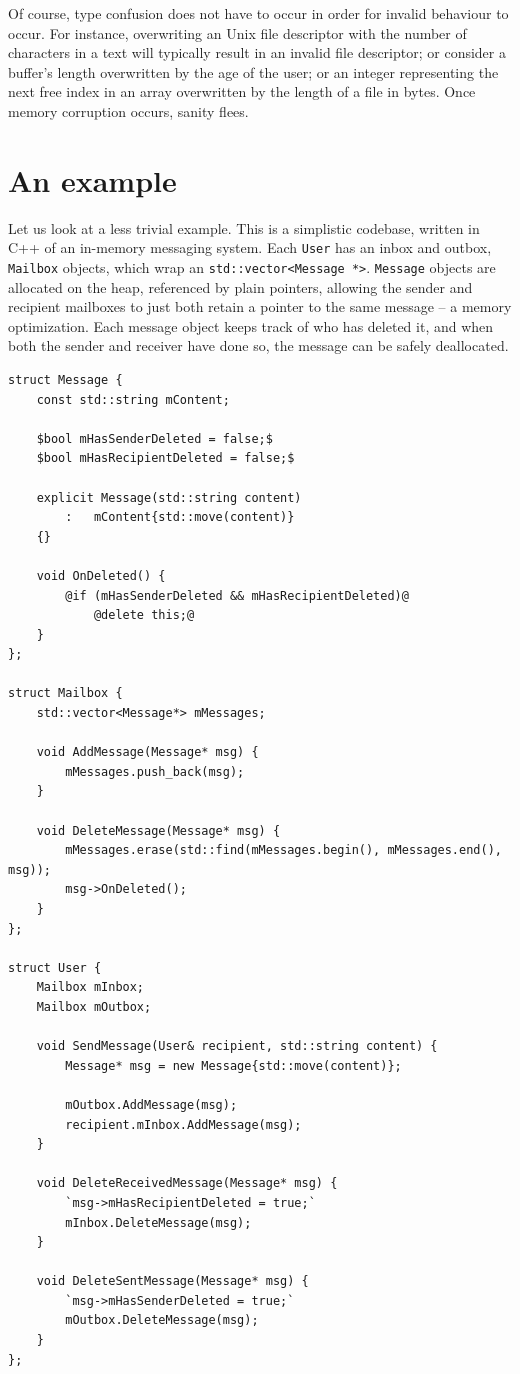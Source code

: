 Of course, type confusion does not have to occur in order for invalid behaviour to occur. For instance, overwriting an Unix file descriptor with the number of characters in a text will typically result in an invalid file descriptor; or consider a buffer's length overwritten by the age of the user; or an integer representing the next free index in an array overwritten by the length of a file in bytes. Once memory corruption occurs, sanity flees.

\section{An example}

Let us look at a less trivial example. This is a simplistic codebase, written in C++ of an in-memory messaging system. Each \lstinline!User! has an inbox and outbox, \lstinline!Mailbox! objects, which wrap an \lstinline!std::vector<Message *>!. \lstinline!Message! objects are allocated on the heap, referenced by plain pointers, allowing the sender and recipient mailboxes to just both retain a pointer to the same message -- a memory optimization. Each message object keeps track of who has deleted it, and when both the sender and receiver have done so, the message can be safely deallocated.

\begin{lstlisting}
struct Message {
	const std::string mContent;

	$bool mHasSenderDeleted = false;$
	$bool mHasRecipientDeleted = false;$

	explicit Message(std::string content)
		:   mContent{std::move(content)}
	{}

	void OnDeleted() {
		@if (mHasSenderDeleted && mHasRecipientDeleted)@
			@delete this;@
	}
};

struct Mailbox {
	std::vector<Message*> mMessages;

	void AddMessage(Message* msg) {
		mMessages.push_back(msg);
	}

	void DeleteMessage(Message* msg) {
		mMessages.erase(std::find(mMessages.begin(), mMessages.end(), msg));
		msg->OnDeleted();
	}
};

struct User {
	Mailbox mInbox;
	Mailbox mOutbox;

	void SendMessage(User& recipient, std::string content) {
		Message* msg = new Message{std::move(content)};

		mOutbox.AddMessage(msg);
		recipient.mInbox.AddMessage(msg);
	}

	void DeleteReceivedMessage(Message* msg) {
		`msg->mHasRecipientDeleted = true;`
		mInbox.DeleteMessage(msg);
	}

	void DeleteSentMessage(Message* msg) {
		`msg->mHasSenderDeleted = true;`
		mOutbox.DeleteMessage(msg);
	}
};
\end{lstlisting}

